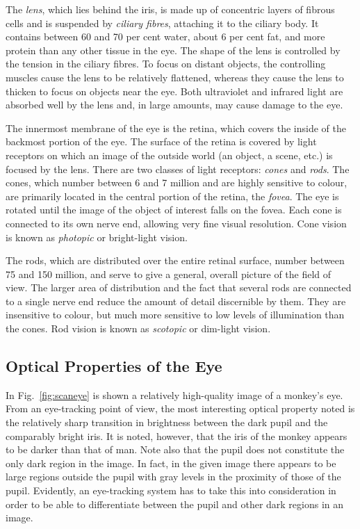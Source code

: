 
The {\em lens\/}, which lies behind the iris, is made up of concentric
layers of fibrous cells and is suspended by {\em ciliary fibres\/},
attaching it to the ciliary body.  It contains between 60 and 70 per
cent water, about 6 per cent fat, and more protein than any other
tissue in the eye.  The shape of the lens is controlled by the tension
in the ciliary fibres.  To focus on distant objects, the controlling
muscles cause the lens to be relatively flattened, whereas they cause
the lens to thicken to focus on objects near the eye.  Both
ultraviolet and infrared light are absorbed well by the lens and, in
large amounts, may cause damage to the eye.

The innermost membrane of the eye is the retina, which covers the
inside of the backmost portion of the eye.  The surface of the retina
is covered by light receptors on which an image of the outside world
(an object, a scene, etc.) is focused by the lens.  There are two
classes of light receptors: {\em cones\/} and {\em rods\/}.  The
cones, which number between 6 and 7 million and are highly sensitive
to colour, are primarily located in the central portion of the
retina, the {\em fovea\/}.  The eye is rotated until the image of the
object of interest falls on the fovea.  Each cone is connected to its
own nerve end, allowing very fine visual resolution.  Cone vision is
known as {\em photopic\/} or bright-light vision.

The rods, which are distributed over the entire retinal surface,
number between 75 and 150 million, and serve to give a general,
overall picture of the field of view.  The larger area of distribution
and the fact that several rods are connected to a single nerve end
reduce the amount of detail discernible by them.  They are insensitive
to colour, but much more sensitive to low levels of illumination than
the cones.  Rod vision is known as {\em scotopic\/} or dim-light
vision.

\subsection{Optical Properties of the Eye}
\label{back:eye:visual}

In Fig.~\ref{fig:scaneye} is shown a relatively high-quality image of
a monkey's eye.  From an eye-tracking point of view, the most
interesting optical property noted is the relatively sharp transition
in brightness between the dark pupil and the comparably bright iris.
It is noted, however, that the iris of the monkey appears to be darker
than that of man.  Note also that the pupil does not constitute the
only dark region in the image.  In fact, in the given image there
appears to be large regions outside the pupil with gray levels in the
proximity of those of the pupil.  Evidently, an eye-tracking system
has to take this into consideration in order to be able to
differentiate between the pupil and other dark regions in an image.

